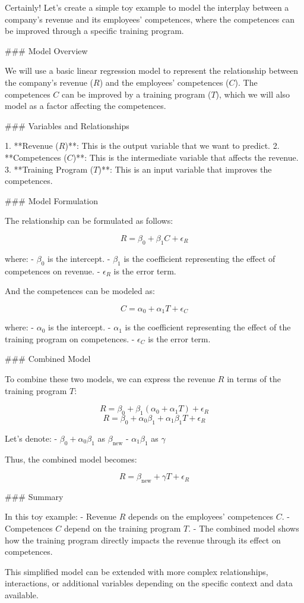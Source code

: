 Certainly! Let's create a simple toy example to model the interplay between a company's revenue and its employees' competences, where the competences can be improved through a specific training program.

### Model Overview

We will use a basic linear regression model to represent the relationship between the company's revenue (\( R \)) and the employees' competences (\( C \)). The competences \( C \) can be improved by a training program (\( T \)), which we will also model as a factor affecting the competences.

### Variables and Relationships

1. **Revenue (\( R \))**: This is the output variable that we want to predict.
2. **Competences (\( C \))**: This is the intermediate variable that affects the revenue.
3. **Training Program (\( T \))**: This is an input variable that improves the competences.

### Model Formulation

The relationship can be formulated as follows:

\[ R = \beta_0 + \beta_1 C + \epsilon_R \]

where:
- \( \beta_0 \) is the intercept.
- \( \beta_1 \) is the coefficient representing the effect of competences on revenue.
- \( \epsilon_R \) is the error term.

And the competences can be modeled as:

\[ C = \alpha_0 + \alpha_1 T + \epsilon_C \]

where:
- \( \alpha_0 \) is the intercept.
- \( \alpha_1 \) is the coefficient representing the effect of the training program on competences.
- \( \epsilon_C \) is the error term.

### Combined Model

To combine these two models, we can express the revenue \( R \) in terms of the training program \( T \):

\[ R = \beta_0 + \beta_1 (\alpha_0 + \alpha_1 T) + \epsilon_R \]
\[ R = \beta_0 + \alpha_0 \beta_1 + \alpha_1 \beta_1 T + \epsilon_R \]

Let's denote:
- \( \beta_0 + \alpha_0 \beta_1 \) as \( \beta_{\text{new}} \)
- \( \alpha_1 \beta_1 \) as \( \gamma \)

Thus, the combined model becomes:

\[ R = \beta_{\text{new}} + \gamma T + \epsilon_R \]

### Summary

In this toy example:
- Revenue \( R \) depends on the employees' competences \( C \).
- Competences \( C \) depend on the training program \( T \).
- The combined model shows how the training program directly impacts the revenue through its effect on competences.

This simplified model can be extended with more complex relationships, interactions, or additional variables depending on the specific context and data available.